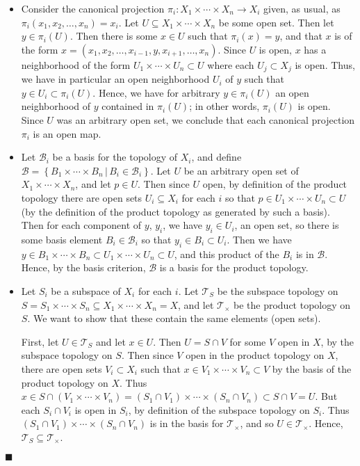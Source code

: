 \documentclass[12pt]{article}
\renewcommand{\qed}{\hfill$\blacksquare$}
\renewenvironment{proof}{\begin{addmargin}[1em]{0em}\begin{newproof}}{\end{newproof}\end{addmargin}\qed}
\begin{document}
\begin{proof}
\begin{itemize}
	\item Consider the canonical projection $\pi_i: X_1 \times \cdots \times X_n \rightarrow X_i$ given, as usual, as $\pi_i \left(x_1,x_2,\ldots,x_n\right) = x_i$. Let $U \subseteq X_1\times \cdots \times X_n$ be some open set. Then let $y \in \pi_i\left(U\right)$. Then there is some $x \in U$ such that $\pi_i\left(x\right) = y$, and that $x$ is of the form $x = \left(x_1,x_2,\ldots, x_{i-1},y,x_{i+1},\ldots,x_n\right)$. Since $U$ is open, $x$ has a neighborhood of the form $U_1 \times \cdots \times U_n \subset U$ where each $U_j \subset X_j$ is open. Thus, we have in particular an open neighborhood $U_i$ of $y$ such that $y \in U_i \subset \pi_i\left(U\right)$. Hence, we have for arbitrary $y \in \pi_i\left(U\right)$ an open neighborhood of $y$ contained in $\pi_i\left(U\right)$; in other words, $\pi_i\left(U\right)$ is open. Since $U$ was an arbitrary open set, we conclude that each canonical projection $\pi_i$ is an open map.
	\item Let $\mathcal{B}_i$ be a basis for the topology of $X_i$, and define $\mathcal{B} = \left\{B_1 \times \cdots \times B_n \, | \, B_i \in \mathcal{B}_i\right\}$. Let $U$ be an arbitrary open set of $X_1\times \cdots \times X_n$, and let $p \in U$. Then since $U$ open, by definition of the product topology there are open sets $U_i \subseteq X_i$ for each $i$ so that $p \in U_1 \times \cdots \times U_n \subset U$ (by the definition of the product topology as generated by such a basis). Then for each component of $y$, $y_i$, we have $y_i \in U_i$, an open set, so there is some basis element $B_i \in \mathcal{B}_i$ so that $y_i \in B_i \subset U_i$. Then we have $y \in B_1 \times \cdots \times B_n \subset U_1 \times \cdots \times U_n \subset U$, and this product of the $B_i$ is in $\mathcal{B}$. Hence, by the basis criterion, $\mathcal{B}$ is a basis for the product topology. 
	\item Let $S_i$ be a subspace of $X_i$ for each $i$. Let $\mathcal{T}_S$ be the subspace topology on $S = S_1 \times \cdots \times S_n \subseteq X_1 \times \cdots \times X_n = X$, and let $\mathcal{T}_{\times}$ be the product topology on $S$. We want to show that these contain the same elements (open sets).
	
	First, let $U \in \mathcal{T}_{S}$ and let $x \in U$. Then $U = S\cap V$ for some $V$ open in $X$, by the subspace topology on $S$. Then since $V$ open in the product topology on $X$, there are open sets $V_i\subset X_i$ such that $x \in V_1 \times \cdots \times V_n \subset V$ by the basis of the product topology on $X$. Thus $x \in S\cap \left(V_1 \times \cdots \times V_n\right) = \left(S_1 \cap V_1\right)\times \cdots \times \left(S_n \cap V_n\right) \subset S\cap V = U$. But each $S_i\cap V_i$ is open in $S_i$, by definition of the subspace topology on $S_i$. Thus $\left(S_1\cap V_1\right)\times \cdots \times \left(S_n\cap V_n\right) $ is in the basis for $\mathcal{T}_{\times}$, and so $U\in \mathcal{T}_{\times}$. Hence, $\mathcal{T}_S \subseteq \mathcal{T}_{\times}$.
	

\end{itemize}
\end{proof}
\end{document}
